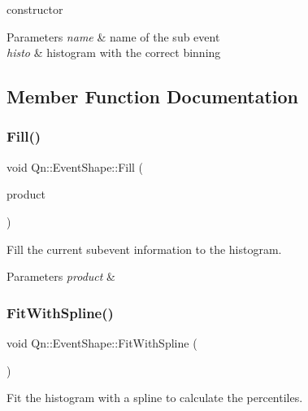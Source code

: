 constructor 
\begin{DoxyParams}{Parameters}
{\em name} & name of the sub event \\
\hline
{\em histo} & histogram with the correct binning \\
\hline
\end{DoxyParams}


\subsection{Member Function Documentation}
\mbox{\label{classQn_1_1EventShape_a7ef94151a36c2c7ab03e5771f216a5f6}} 
\subsubsection{\texorpdfstring{Fill()}{Fill()}}
{\footnotesize\ttfamily void Qn\+::\+Event\+Shape\+::\+Fill (\begin{DoxyParamCaption}\item[{const \mbox{\hyperlink{structQn_1_1Product}{Product}} \&}]{product }\end{DoxyParamCaption})\hspace{0.3cm}{\ttfamily [inline]}}

Fill the current subevent information to the histogram. 
\begin{DoxyParams}{Parameters}
{\em product} & \\
\hline
\end{DoxyParams}
\mbox{\label{classQn_1_1EventShape_af2c3ca720b05814421f7293fadacc312}} 
\subsubsection{\texorpdfstring{Fit\+With\+Spline()}{FitWithSpline()}}
{\footnotesize\ttfamily void Qn\+::\+Event\+Shape\+::\+Fit\+With\+Spline (\begin{DoxyParamCaption}{ }\end{DoxyParamCaption})}

Fit the histogram with a spline to calculate the percentiles. \mbox{\label{classQn_1_1EventShape_abfcccc33d6d51fdac3f72ac4039a4ad1}} 
